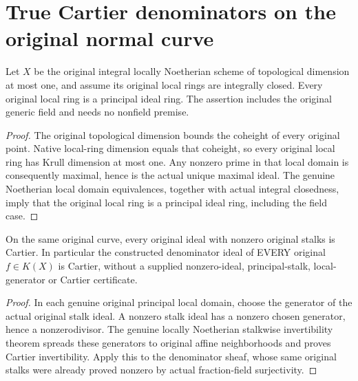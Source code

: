 \section{True Cartier denominators on the original normal curve}

\begin{theorem}
\label{thm:fc-curve-normal-stalk-principal}
\leanok
{}
Let $X$ be the original integral locally Noetherian scheme of topological
dimension at most one, and assume its original local rings are integrally
closed. Every original local ring is a principal ideal ring. The assertion
includes the original generic field and needs no nonfield premise.
\end{theorem}
\begin{proof}
The original topological dimension bounds the coheight of every original
point. Native local-ring dimension equals that coheight, so every original
local ring has Krull dimension at most one. Any nonzero prime in that
local domain is consequently maximal, hence is the actual unique maximal
ideal. The genuine Noetherian local domain equivalences, together with
actual integral closedness, imply that the original local ring is a
principal ideal ring, including the field case.
\end{proof}

\begin{theorem}
\label{thm:fc-curve-denominator-cartier}
\leanok
{}
On the same original curve, every original ideal with nonzero original
stalks is Cartier. In particular the constructed denominator ideal of
EVERY original $f\in K(X)$ is Cartier, without a supplied nonzero-ideal,
principal-stalk, local-generator or Cartier certificate.
\end{theorem}
\begin{proof}
In each genuine original principal local domain, choose the generator of
the actual original stalk ideal. A nonzero stalk ideal has a nonzero
chosen generator, hence a nonzerodivisor. The genuine locally Noetherian
stalkwise invertibility theorem spreads these generators to original
affine neighborhoods and proves Cartier invertibility. Apply this to
the denominator sheaf, whose same original stalks were already proved
nonzero by actual fraction-field surjectivity.
\end{proof}
